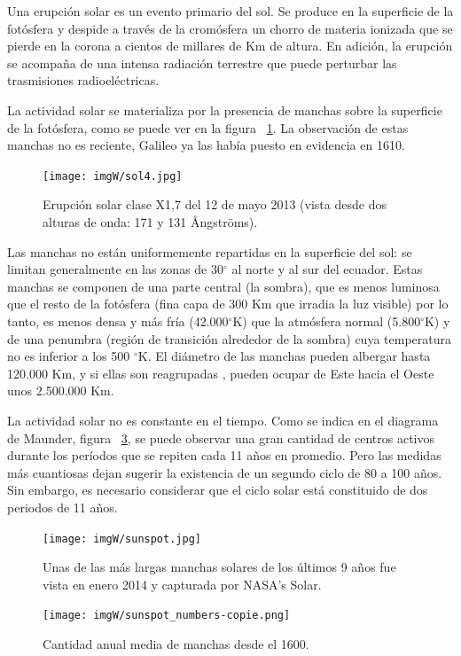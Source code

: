 \documentclass[a4paper,openright,12pt]{report}
\newcommand{\grad}{$^{\circ}$}
\begin{document}
Una erupción solar es un evento primario del sol. Se produce en la superficie de la fotósfera y despide a través de la cromósfera un chorro de materia ionizada que se pierde en la corona a cientos de millares de Km de altura. En adición, la erupción se acompaña de una intensa radiación terrestre que puede perturbar las trasmisiones radioeléctricas.

La actividad solar se materializa por la presencia de manchas sobre la superficie de la fotósfera, como se puede ver en la figura ~\ref{sol2}. La observación de estas manchas no es reciente, Galileo ya las había puesto en evidencia en 1610.

\begin{figure}[H]
	\centering
	\texttt{[image: imgW/sol4.jpg]}
	\caption{Erupción solar clase X1,7 del 12 de mayo 2013 (vista desde dos alturas de onda: 171 y 131 \AA ngströms). }\cite{NASA}
	\label{sol2}
\end{figure}


Las manchas no están uniformemente repartidas en la superficie del sol:  se limitan generalmente en las zonas de \mbox{30\grad}  al norte y al sur del ecuador. Estas manchas se componen de una parte central (la sombra), que es menos luminosa que el resto de la fotósfera (fina capa de 300 Km que  irradia la luz visible) por lo tanto, es menos densa y más fría (42.000\grad K) que la atmósfera normal (5.800\grad K) y de una penumbra (región de transición alrededor de la sombra) cuya temperatura no es inferior a los 500 \grad K. El diámetro de las manchas pueden albergar hasta 120.000 Km, y si ellas son reagrupadas , pueden ocupar de Este hacia el Oeste unos 2.500.000 Km.

La actividad solar no es constante en el tiempo. Como se indica en el diagrama de Maunder,  figura ~\ref{maunder}, se puede observar una gran cantidad de centros activos durante los períodos que se repiten cada  11 años en promedio. Pero las medidas más cuantiosas dejan sugerir la existencia de un segundo ciclo de 80 a 100 años. Sin embargo, es necesario  considerar que el ciclo solar está constituido de dos periodos de 11 años.

\begin{figure}[H]
	\centering
	\texttt{[image: imgW/sunspot.jpg]}
	\caption{Unas de las más largas manchas solares de los últimos 9 años  fue vista en enero 2014 y capturada por NASA's Solar.  }\cite{NASA1}
	\label{sunspot}
\end{figure}


\begin{figure}[H]
	\centering
	\texttt{[image: imgW/sunspot\_numbers-copie.png]}
	\caption{Cantidad anual media de manchas desde el  1600. }\cite{NASA2}
	\label{maunder}
\end{figure}
\end{document}
